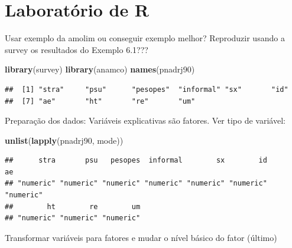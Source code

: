 \documentclass[]{book}
\newenvironment{Shaded}{\begin{snugshade}}{\end{snugshade}}
\newcommand{\KeywordTok}[1]{\textcolor[rgb]{0.13,0.29,0.53}{\textbf{#1}}}
\newcommand{\NormalTok}[1]{#1}
\theoremstyle{definition}
\theoremstyle{definition}
\theoremstyle{definition}
\theoremstyle{remark}
\begin{document}
\section{Laboratório de R}\label{laboratorio-de-r-3}

Usar exemplo da amolim ou conseguir exemplo melhor? Reproduzir usando a
survey os resultados do Exemplo 6.1???

\begin{Shaded}
\begin{Highlighting}[]
\KeywordTok{library}\NormalTok{(survey)}
\KeywordTok{library}\NormalTok{(anamco)}
\KeywordTok{names}\NormalTok{(pnadrj90)}
\end{Highlighting}
\end{Shaded}

\begin{verbatim}
##  [1] "stra"     "psu"      "pesopes"  "informal" "sx"       "id"      
##  [7] "ae"       "ht"       "re"       "um"
\end{verbatim}

Preparação dos dados: Variáveis explicativas são fatores. Ver tipo de
variável:

\begin{Shaded}
\begin{Highlighting}[]
\KeywordTok{unlist}\NormalTok{(}\KeywordTok{lapply}\NormalTok{(pnadrj90, mode))}
\end{Highlighting}
\end{Shaded}

\begin{verbatim}
##      stra       psu   pesopes  informal        sx        id        ae 
## "numeric" "numeric" "numeric" "numeric" "numeric" "numeric" "numeric" 
##        ht        re        um 
## "numeric" "numeric" "numeric"
\end{verbatim}

Transformar variáveis para fatores e mudar o nível básico do fator
(último)
\end{document}
